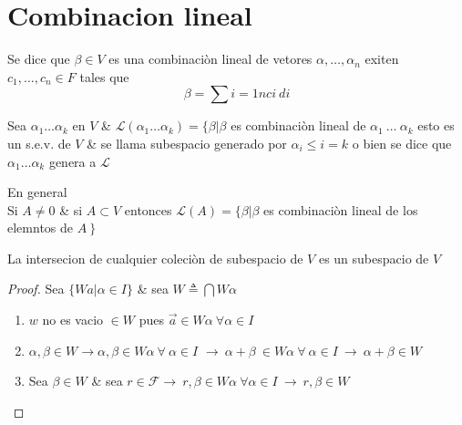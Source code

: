 \newpage
\section{Combinacion lineal}
\begin{definicion}
	Se dice que $\beta \in V $ es una combinaci\`on lineal de vetores $\alpha , \dots , \alpha_n$ exiten $c_1, \dots , c_n \in F$ tales que
			\begin{equation}
				\beta = \sum\limits{i=1}{n} ci \ di \nonumber
			\end{equation}

	\end{definicion}

	

 
 
 \begin{definicion}
 	Sea $\alpha_1 \dots \alpha_k$ en $V$ \& $\mathcal{L}(\alpha_1 \dots \alpha_k)=\{ \beta	| \beta$ es combinaci\`on lineal de $\alpha_1 \ \dots \ \alpha_k$ esto es un s.e.v. de $V$ \& se llama subespacio generado por $\alpha_i \leq i = k$ o bien se dice que $\alpha_1 \dots \alpha_k$ genera a $\mathcal{L}$
 \end{definicion}

En general \\ Si $A \neq 0$	\& si $ A \subset V $ entonces $\mathcal{L} (A)= \{ \beta | \beta $ es combinaci\`on lineal de los elemntos de $A \ \}$
\begin{proposicion}
			La intersecion de cualquier coleci\`on de subespacio de $V$ es un subespacio de $V$	 	 										
	 	 									\end{proposicion}	 	 									
\begin{proof}
Sea $ \{ Wa | \alpha \in I \} $ \& sea $ W \triangleq \bigcap W \alpha $
	
		\begin{enumerate}[i]
			\item  $w$ no es vacio  $\in W$ pues $\vec{a} \in W \alpha \ \forall \alpha \in I$

			\item $\alpha , \beta \in W \rightarrow \alpha , \beta \in W \alpha \ \forall \ \alpha \in I$  $\rightarrow \ \alpha + \beta \ \in W \alpha \ \forall \ \alpha \in I \ \rightarrow \ \alpha + \beta \in W$

			\item  Sea $\beta \in W $ \& sea $r \in \mathcal{F} \rightarrow \ r ,\beta \in W \alpha \ \forall \alpha\in I \ \rightarrow \ r, \beta \in W$
		\end{enumerate}

\end{proof}

